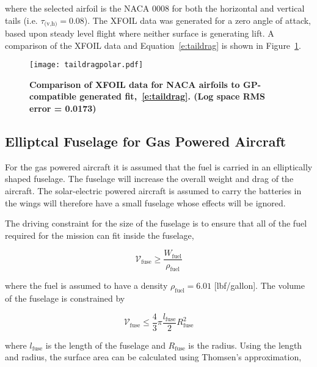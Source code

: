 \documentclass[]{aiaa-tc}%
\begin{document}
where the selected airfoil is the NACA 0008 for both the horizontal and vertical tails (i.e. $\tau_{\text{(v,h)}} = 0.08$). 
The XFOIL data was generated for a zero angle of attack, based upon steady level flight where neither surface is generating lift.  
A comparison of the XFOIL data and Equation~\eqref{e:taildrag} is shown in Figure~\ref{f:taildragpolar}.

\begin{figure}[H]
	\begin{center}
	\texttt{[image: taildragpolar.pdf]}
    \caption{\textbf{Comparison of XFOIL data for NACA airfoils to GP-compatible generated fit,~\eqref{e:taildrag}. (Log space RMS error = 0.0173)}}
	\label{f:taildragpolar}
	\end{center}
\end{figure}

\subsection{Elliptcal Fuselage for Gas Powered Aircraft}

For the gas powered aircraft it is assumed that the fuel is carried in an elliptically shaped fuselage.  The fuselage will increase the overall weight and drag of the aircraft.  The solar-electric powered aircraft is assumed to carry the batteries in the wings will therefore have a small fuselage whose effects will be ignored.  

The driving constraint for the size of the fuselage is to ensure that all of the fuel required for the mission can fit inside the fuselage, 

\begin{equation}
    \label{e:fusevol}
    \mathcal{V}_{\text{fuse}} \geq \frac{W_\text{fuel}}{\rho_\text{fuel}}
\end{equation}

where the fuel is assumed to have a density $\rho_\text{fuel} = 6.01$ [lbf/gallon].  The volume of the fuselage is constrained by

\begin{equation}
    \label{e:fusevol2}
    \mathcal{V}_{\text{fuse}} \leq \frac{4}{3}\pi \frac{l_{\text{fuse}}}{2}R_{\text{fuse}}^2
\end{equation}

where $l_{\text{fuse}}$ is the length of the fuselage and $R_{\text{fuse}}$ is the radius. Using the length and radius, the surface area can be calculated using Thomsen's approximation,\cite{ellipsoidSA}
\end{document}

